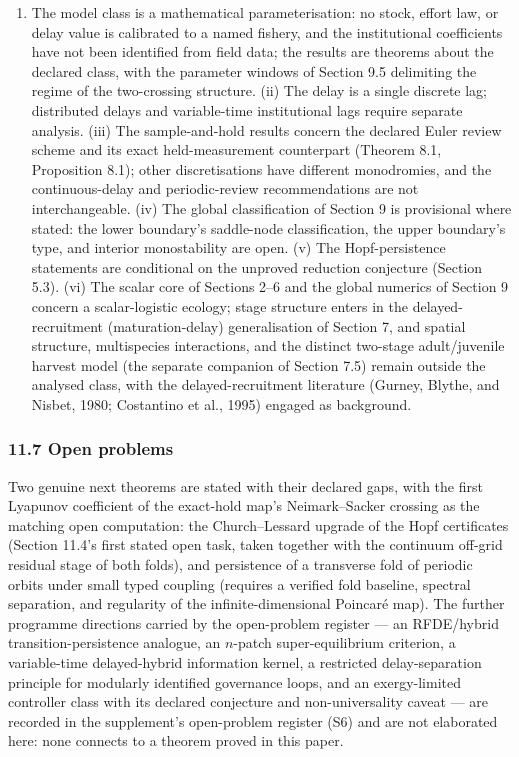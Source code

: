\documentclass[11pt]{article}
\providecommand{\tightlist}{\setlength{\itemsep}{0pt}\setlength{\parskip}{0pt}}
\begin{document}
\begin{enumerate}
\def\labelenumi{(\roman{enumi})}
\tightlist
\item
  The model class is a mathematical parameterisation: no stock, effort
  law, or delay value is calibrated to a named fishery, and the
  institutional coefficients have not been identified from field data;
  the results are theorems about the declared class, with the parameter
  windows of Section 9.5 delimiting the regime of the two-crossing
  structure. (ii) The delay is a single discrete lag; distributed delays
  and variable-time institutional lags require separate analysis. (iii)
  The sample-and-hold results concern the declared Euler review scheme
  and its exact held-measurement counterpart (Theorem 8.1, Proposition
  8.1); other discretisations have different monodromies, and the
  continuous-delay and periodic-review recommendations are not
  interchangeable. (iv) The global classification of Section 9 is
  provisional where stated: the lower boundary's saddle-node
  classification, the upper boundary's type, and interior monostability
  are open. (v) The Hopf-persistence statements are conditional on the
  unproved reduction conjecture (Section 5.3). (vi) The scalar core of
  Sections 2--6 and the global numerics of Section 9 concern a
  scalar-logistic ecology; stage structure enters in the
  delayed-recruitment (maturation-delay) generalisation of Section 7,
  and spatial structure, multispecies interactions, and the distinct
  two-stage adult/juvenile harvest model (the separate companion of
  Section 7.5) remain outside the analysed class, with the
  delayed-recruitment literature (Gurney, Blythe, and Nisbet, 1980;
  Costantino et al., 1995) engaged as background.
\end{enumerate}

\subsubsection{11.7 Open problems}\label{open-problems}

Two genuine next theorems are stated with their declared gaps, with the
first Lyapunov coefficient of the exact-hold map's Neimark--Sacker
crossing as the matching open computation: the Church--Lessard upgrade
of the Hopf certificates (Section 11.4's first stated open task, taken
together with the continuum off-grid residual stage of both folds), and
persistence of a transverse fold of periodic orbits under small typed
coupling (requires a verified fold baseline, spectral separation, and
regularity of the infinite-dimensional Poincar\'e map). The further
programme directions carried by the open-problem register --- an
RFDE/hybrid transition-persistence analogue, an \(n\)-patch
super-equilibrium criterion, a variable-time delayed-hybrid information
kernel, a restricted delay-separation principle for modularly identified
governance loops, and an exergy-limited controller class with its
declared conjecture and non-universality caveat --- are recorded in the
supplement's open-problem register (S6) and are not elaborated here:
none connects to a theorem proved in this paper.
\end{document}
